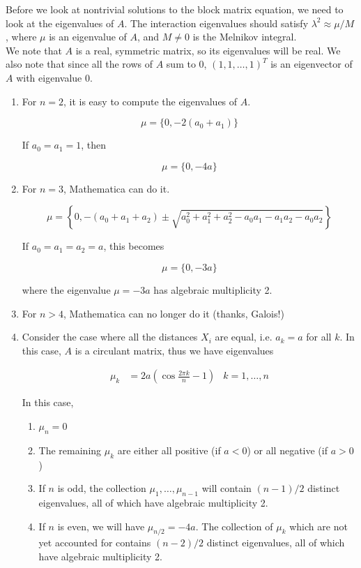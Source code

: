\documentclass[12pt]{article}
\begin{document}
Before we look at nontrivial solutions to the block matrix equation, we need to look at the eigenvalues of $A$. The interaction eigenvalues should satisfy $\lambda^2 \approx \mu / M$, where $\mu$ is an eigenvalue of $A$, and $M \neq 0$ is the Melnikov integral.\\

We note that $A$ is a real, symmetric matrix, so its eigenvalues will be real. We also note that since all the rows of $A$ sum to 0, $(1, 1, \dots, 1)^T$ is an eigenvector of $A$ with eigenvalue 0.

\begin{enumerate}

\item For $n = 2$, it is easy to compute the eigenvalues of $A$.

\[
\mu = \{ 0, -2(a_0 + a_1) \}
\]

If $a_0 = a_1 = 1$, then

\[
\mu = \{ 0, -4 a \}
\]

\item For $n = 3$, Mathematica can do it.

\[
\mu = \left\{0,  -(a_0 + a_1 + a_2) \pm 
\sqrt{ a_0^2 + a_1^2 + a_2^2 - a_0 a_1 - a_1 a_2 - a_0 a_2 }\right\}
\]

If $a_0 = a_1 = a_2 = a$, this becomes

\[
\mu = \{0,  -3a \}
\]

where the eigenvalue $\mu = -3a$ has algebraic multiplicity 2. 

\item For $n > 4$, Mathematica can no longer do it (thanks, Galois!) 

\item Consider the case where all the distances $X_i$ are equal, i.e. $a_k = a$ for all $k$. In this case, $A$ is a circulant matrix, thus we have eigenvalues

\begin{align*}
\mu_k &= 2 a\left( \cos \frac{2 \pi k}{n}  - 1 \right) & k = 1, \dots, n
\end{align*}

In this case,

\begin{enumerate}
	\item $\mu_n = 0$
	\item The remaining $\mu_k$ are either all positive (if $a < 0$) or all negative (if $a > 0$)
	\item If $n$ is odd, the collection $\mu_1, \dots, \mu_{n-1}$ will contain $(n-1)/2$ distinct eigenvalues, all of which have algebraic multiplicity 2.
	\item If $n$ is even, we will have $\mu_{n/2} = -4a$. The collection of $\mu_k$ which are not yet accounted for contains $(n-2)/2$ distinct eigenvalues, all of which have algebraic multiplicity 2.
\end{enumerate}

\end{enumerate}
\end{document}
